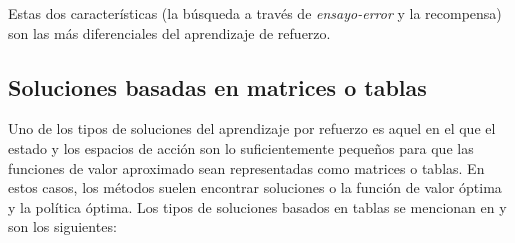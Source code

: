 \noindent
Estas dos características (la búsqueda a través de \textit{ensayo-error} y la recompensa) son las más diferenciales del aprendizaje de refuerzo.


\subsection{Soluciones basadas en matrices o tablas}

Uno de los tipos de soluciones del aprendizaje por refuerzo es aquel en el que el estado y los espacios de acción son lo suficientemente pequeños para que las funciones de valor aproximado sean representadas como matrices o tablas. En estos casos, los métodos suelen encontrar soluciones o la función de valor óptima y la política óptima. Los tipos de soluciones basados en tablas se mencionan en \cite{sutton_barto} y  son los siguientes:\\

